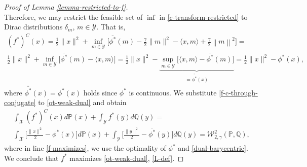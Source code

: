 \documentclass{article} %
\begin{document}
\begin{proof}[Proof of Lemma \ref{lemma-restricted-to-f}]
\begin{equation}
    \label{jensen-expect}
\end{equation}
Therefore, we may restrict the feasible set of $\inf$ in \eqref{c-transform-restricted} to Dirac distributions $\delta_{m}$, $m\in\mathcal{Y}$. That is,
\begin{eqnarray}
    (f^{*})^{C}(x)=\frac{1}{2}\|x\|^{2}+\inf_{m\in\mathcal{Y}}\bigg[\overline{\phi^{*}}(m)-\frac{\gamma}{2}\|m\|^{2}-\langle x,m\rangle+\frac{\gamma}{2}\left\|m\right\|^{2}\bigg]=
    \nonumber
    \\
    \frac{1}{2}\|x\|^{2}+\inf_{m\in\mathcal{Y}}\bigg[\overline{\phi^{*}}(m)-\langle x,m\rangle\bigg]=\frac{1}{2}\|x\|^{2}-\underbrace{\sup_{m\in\mathcal{Y}}\bigg[\langle x,m\rangle-\overline{\phi^{*}}(m)\bigg]}_{=\overline{\overline{\phi^{*}}}(x)}=\frac{1}{2}\|x\|^{2}-\phi^{*}(x),
    \label{f-c-through-conjugate}
\end{eqnarray}
where $\overline{\overline{\phi^{*}}}(x)=\phi^{*}(x)$ holds since $\phi^{*}$ is continuous. We substitute \eqref{f-c-through-conjugate} to \eqref{ot-weak-dual} and obtain
\begin{eqnarray}
    \int_{\mathcal{X}}(f^{*})^{C}(x)d\mathbb{P}(x)+\int_{\mathcal{Y}}f^{*}(y)d\mathbb{Q}(y)=
    \nonumber
    \\
    \int_{\mathcal{X}}\big[\frac{\|x\|^{2}}{2}-\phi^{*}(x)\big]d\mathbb{P}(x)+\int_{\mathcal{Y}}\big[\frac{\|y\|^{2}}{2}-\overline{\phi^{*}}(y)\big]d\mathbb{Q}(y)=\mathcal{W}_{2,\gamma}^{2}(\mathbb{P},\mathbb{Q}),
    \label{f-maximizes}
\end{eqnarray}
where in line \eqref{f-maximizes}, we use the optimality of $\phi^{*}$ and \eqref{dual-barycentric}. We conclude that $f^{*}$ maximizes \eqref{ot-weak-dual}, \eqref{L-def}.
\end{proof}
\end{document}
